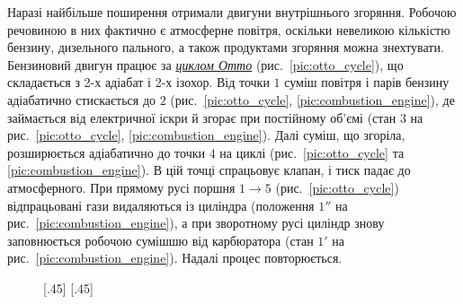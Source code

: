 %	

Наразі найбільше поширення отримали двигуни внутрішнього згоряння. Робочою речовиною в них
фактично є атмосферне повітря, оскільки невеликою кількістю бензину, дизельного пального, а також
продуктами згоряння можна знехтувати. Бензиновий двигун працює за
\href{https://web.mit.edu/16.unified/www/SPRING/propulsion/notes/node25.html}{\emph{циклом Отто}}
(рис.~\ref{pic:otto_cycle}), що складається з 2-х адіабат і 2-х ізохор. Від точки $1$ суміш повітря
і парів бензину адіабатично стискається до $2$ (рис.~\ref{pic:otto_cycle},
\ref{pic:combustion_engine}), де займається від електричної іскри й згорає при
постійному об'ємі (стан $3$ на рис.~\ref{pic:otto_cycle}, \ref{pic:combustion_engine}). Далі суміш, що
згоріла, розширюється
адіабатично до точки $4$ на циклі (рис.~\ref{pic:otto_cycle} та \ref{pic:combustion_engine}). В цій
точці
спрацьовує клапан, і тиск падає до атмосферного. При
прямому русі поршня $1\rightarrow5$ (рис.~\ref{pic:otto_cycle}) відпрацьовані гази видаляються із
циліндра (положення $1''$ на рис.~\ref{pic:combustion_engine}), а
при зворотному русі циліндр знову заповнюється робочою сумішшю від карбюратора (стан $1'$ на
рис.~\ref{pic:combustion_engine}). Надалі процес повторюється.


\begin{figure}[h!]\centering
{}%
[.45\textwidth]%
{}%
%
[.45\textwidth]%
{}%
\end{figure}

%	

